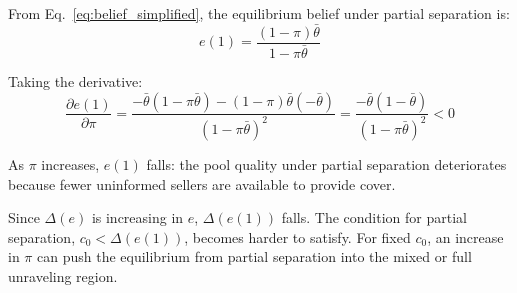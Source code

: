 From Eq.~\eqref{eq:belief_simplified}, the equilibrium belief under partial separation is:
\begin{equation}
    e(1) = \frac{(1-\pi)\bar{\theta}}{1 - \pi\bar{\theta}}
\end{equation}

Taking the derivative:
\begin{equation}
    \frac{\partial e(1)}{\partial \pi} = \frac{-\bar{\theta}(1-\pi\bar{\theta}) - (1-\pi)\bar{\theta}(-\bar{\theta})}{(1-\pi\bar{\theta})^2} = \frac{-\bar{\theta}(1-\bar{\theta})}{(1-\pi\bar{\theta})^2} < 0
\end{equation}

As $\pi$ increases, $e(1)$ falls: the pool quality under partial separation deteriorates because fewer uninformed sellers are available to provide cover.

Since $\Delta(e)$ is increasing in $e$, $\Delta(e(1))$ falls. The condition for partial separation, $c_0 < \Delta(e(1))$, becomes harder to satisfy. For fixed $c_0$, an increase in $\pi$ can push the equilibrium from partial separation into the mixed or full unraveling region.
